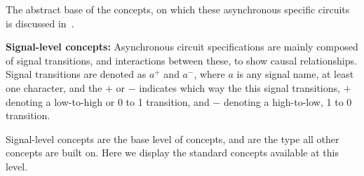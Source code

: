 \documentclass[british,conference,compsoc]{IEEEtran}
\begin{document}

The abstract base of the concepts, on which these asynchronous specific circuits
is discussed in~\cite{2015_Beaumont_MEMOCODE}.



%

\textbf{\label{signal-level}Signal-level concepts:} Asynchronous circuit specifications
are mainly composed of signal transitions, and interactions between these, to show
causal relationships. Signal transitions are denoted as $a^{+}$ and $a^{-}$, where $a$ is
any signal name, at least one character, and the $+$ or $-$ indicates which way the 
this signal transitions, $+$ denoting a low-to-high or 0 to 1 transition, and $-$ denoting
a high-to-low, 1 to 0 transition. 

Signal-level concepts are the base level of concepts, and are 
the type all other concepts are built on. Here we display the standard concepts
available at this level.
\end{document}
